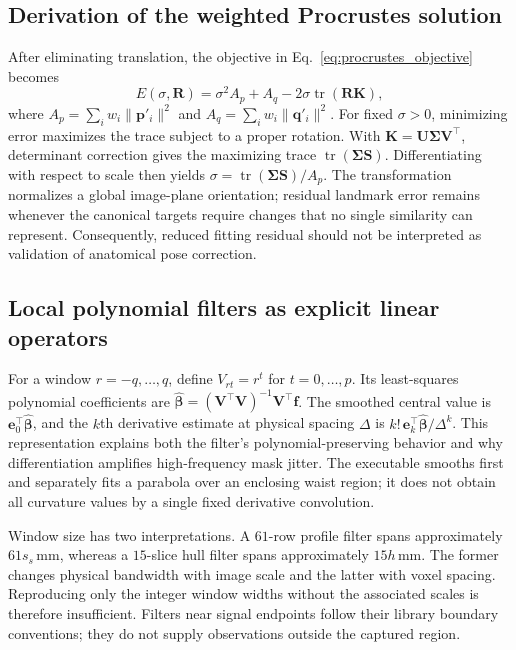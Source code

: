 \subsection{Derivation of the weighted Procrustes solution}
After eliminating translation, the objective in Eq.~\eqref{eq:procrustes_objective} becomes
\begin{equation}
E(\sigma,\mathbf R)=\sigma^2A_p+A_q-2\sigma\operatorname{tr}(\mathbf R\mathbf K),
\end{equation}
where $A_p=\sum_iw_i\|\mathbf p'_i\|^2$ and $A_q=\sum_iw_i\|\mathbf q'_i\|^2$. For fixed $\sigma>0$, minimizing error maximizes the trace subject to a proper rotation. With $\mathbf K=\mathbf U\mathbf\Sigma\mathbf V^\top$, determinant correction gives the maximizing trace $\operatorname{tr}(\mathbf\Sigma\mathbf S)$. Differentiating with respect to scale then yields $\sigma=\operatorname{tr}(\mathbf\Sigma\mathbf S)/A_p$. The transformation normalizes a global image-plane orientation; residual landmark error remains whenever the canonical targets require changes that no single similarity can represent. Consequently, reduced fitting residual should not be interpreted as validation of anatomical pose correction.

\subsection{Local polynomial filters as explicit linear operators}
For a window $r=-q,\ldots,q$, define $V_{rt}=r^t$ for $t=0,\ldots,p$. Its least-squares polynomial coefficients are $\hat{\boldsymbol\beta}=(\mathbf V^\top\mathbf V)^{-1}\mathbf V^\top\mathbf f$. The smoothed central value is $\mathbf e_0^\top\hat{\boldsymbol\beta}$, and the $k$th derivative estimate at physical spacing $\Delta$ is $k!\,\mathbf e_k^\top\hat{\boldsymbol\beta}/\Delta^k$. This representation explains both the filter's polynomial-preserving behavior and why differentiation amplifies high-frequency mask jitter. The executable smooths first and separately fits a parabola over an enclosing waist region; it does not obtain all curvature values by a single fixed derivative convolution.

Window size has two interpretations. A $61$-row profile filter spans approximately $61s_s$\,mm, whereas a $15$-slice hull filter spans approximately $15h$\,mm. The former changes physical bandwidth with image scale and the latter with voxel spacing. Reproducing only the integer window widths without the associated scales is therefore insufficient. Filters near signal endpoints follow their library boundary conventions; they do not supply observations outside the captured region.

